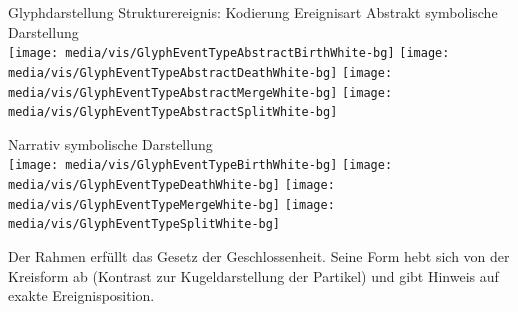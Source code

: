 \documentclass[10pt]{beamer}
\begin{document}
\begin{frame}{Glyphdarstellung Strukturereignis: Kodierung Ereignisart}
	Abstrakt symbolische Darstellung\\
					\texttt{[image: media/vis/GlyphEventTypeAbstractBirthWhite-bg]}
					\hspace*{.06\textwidth}%
					\texttt{[image: media/vis/GlyphEventTypeAbstractDeathWhite-bg]}
					\hspace*{.06\textwidth}%
					\texttt{[image: media/vis/GlyphEventTypeAbstractMergeWhite-bg]}
					\hspace*{.06\textwidth}%
					\texttt{[image: media/vis/GlyphEventTypeAbstractSplitWhite-bg]}
					
	Narrativ symbolische Darstellung\\
					\texttt{[image: media/vis/GlyphEventTypeBirthWhite-bg]}
					\hspace*{.06\textwidth}%
					\texttt{[image: media/vis/GlyphEventTypeDeathWhite-bg]}
					\hspace*{.06\textwidth}%
					\texttt{[image: media/vis/GlyphEventTypeMergeWhite-bg]}
					\hspace*{.06\textwidth}%
					\texttt{[image: media/vis/GlyphEventTypeSplitWhite-bg]}
					
	Der Rahmen erfüllt das Gesetz der Geschlossenheit. Seine Form hebt sich von der Kreisform ab (Kontrast zur Kugeldarstellung der Partikel) und gibt Hinweis auf exakte Ereignisposition.
\end{frame}
\end{document}
